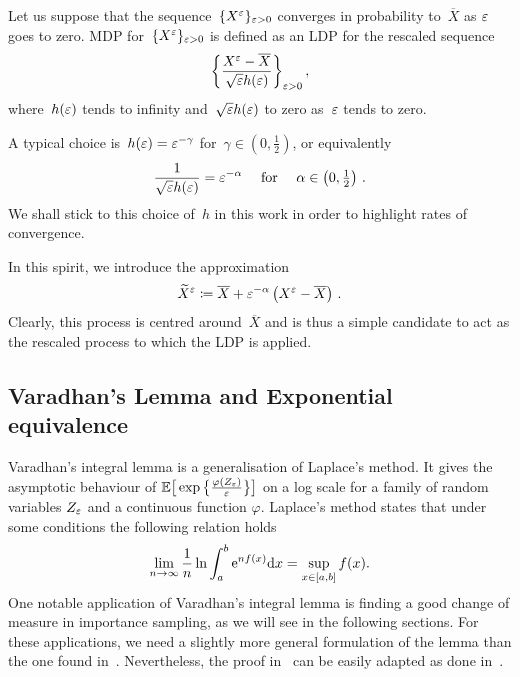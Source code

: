 \begin{definition}
Let us suppose that the sequence~$\{X^{\varepsilon}\}_{\varepsilon>0}$ converges in probability to~$\overline{X}$ as $\varepsilon$ goes to zero. MDP for~$\{X^{\varepsilon}\}_{\varepsilon>0}$ is defined as an LDP for the rescaled sequence 
$$
\left\{\frac{X^{\varepsilon} - \overline{X}}{\sqrt{\varepsilon}h(\varepsilon)}
\right\}_{\varepsilon>0},
$$
where~$h(\varepsilon)$ tends to infinity and~$\sqrt{\varepsilon}h(\varepsilon)$ to zero as~$\varepsilon$ tends to zero. 
\end{definition}
\begin{remark}
   A typical choice is~$h(\varepsilon) = \varepsilon^{-\gamma}$ for~$\gamma \in (0,\frac{1}{2})$, or equivalently
   $$\frac{1}{\sqrt{\varepsilon}h(\varepsilon)} = \varepsilon^{-\alpha} \quad \text{ for } \quad \alpha\in\left(0,\tfrac{1}{2}\right)\,.$$
   We shall stick to this choice of~$h$ in this work in order to highlight rates of convergence. 
\end{remark}

In this spirit, we introduce the approximation
\begin{equation}\label{eq:MDPSmallNoiseGeneral}
\widetilde{X}^{\varepsilon} \coloneqq \overline{X} + 
\varepsilon^{-\alpha}\left(X^{\varepsilon} - \overline{X}\right)\,.
\end{equation}
Clearly, this process is centred around~$\overline{X}$ and is thus a simple candidate to act as the rescaled process to which the LDP is applied. 


\subsection{Varadhan's Lemma and Exponential equivalence}\label{sec:varadhan}

Varadhan's integral lemma is a generalisation of Laplace's method. It gives the asymptotic behaviour of $\mathbb{E}\big[\exp\big\{\frac{\varphi(Z_{\varepsilon})}{\varepsilon}\big\}\big]$ on a log scale for a family of random variables $Z_{\varepsilon}$ and a continuous function $\varphi$. Laplace's method states that under some conditions the following relation holds
$$\lim_{n\rightarrow\infty}\frac{1}{n}\ln \int_a^b \mathrm{e}^{n f(x)} \mathrm{d} x = \sup\limits_{x\in[a,b]}f(x).$$
One notable application of Varadhan's integral lemma is finding a good change of measure in importance sampling, as we will see in the following sections. For these applications, we need a slightly more general formulation of the lemma than the one found in~\cite[Theorem~4.3.1]{Dembo2010LargeApplications}. Nevertheless, the proof in~\cite[Theorem~4.3.1]{Dembo2010LargeApplications} can be easily adapted as done in~\cite[Lemma~4.4.]{Robertson2010SampleModels}.

